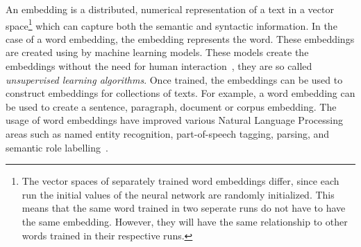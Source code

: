 \documentclass[../../Thesis.tex]{subfiles}
\begin{document}
An embedding is a distributed, numerical representation of a text in a vector space\footnote{The vector spaces of separately trained word embeddings differ, since each run the initial values of the neural network are randomly initialized. This means that the same word trained in two seperate runs do not have to have the same embedding. However, they will have the same relationship to other words trained in their respective runs.} which can capture both the semantic and syntactic information\cite{mikolov2013distributed}. In the case of a word embedding, the embedding represents the word. These embeddings are created using by machine learning models. These models create the embeddings without the need for human interaction~\cite{lai2016generate}, they are so called \textit{unsupervised learning algorithms}. Once trained, the embeddings can be used to construct embeddings for collections of texts. For example, a word embedding can be used to create a sentence, paragraph, document or corpus embedding. The usage of word embeddings have improved various Natural Language Processing areas such as named entity recognition, part-of-speech tagging, parsing, and semantic role labelling~\citet{luong2013better}.
\end{document}

